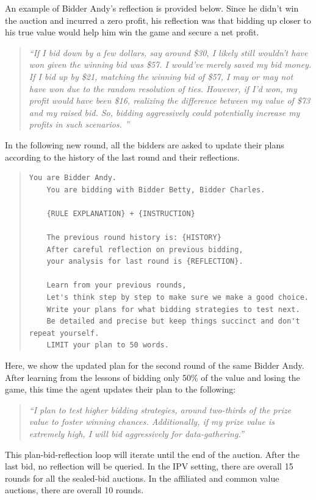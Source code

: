 \documentclass{article} %
\begin{document}
An example of Bidder Andy's reflection is provided below. Since he didn't win the auction and incurred a zero profit, his reflection was that bidding up closer to his true value would help him win the game and secure a net profit.
\begin{quote}
   \textit{ ``If I bid down by a few dollars, say around \$30, I likely still wouldn't have won given the winning bid was \$57. I would've merely saved my bid money. If I bid up by \$21, matching the winning bid of \$57, I may or may not have won due to the random resolution of ties. However, if I'd won, my profit would have been \$16, realizing the difference between my value of \$73 and my raised bid. So, bidding aggressively could potentially increase my profits in such scenarios. ''}
\end{quote}

In the following new round, all the bidders are asked to update their plans according to the history of the last round and their reflections.
\begin{quote}
\begin{lstlisting}[basicstyle=\ttfamily]
    You are Bidder Andy.            
    You are bidding with Bidder Betty, Bidder Charles.     
    
    {RULE EXPLANATION} + {INSTRUCTION}

    The previous round history is: {HISTORY}
    After careful reflection on previous bidding,
    your analysis for last round is {REFLECTION}. 
    
    Learn from your previous rounds, 
    Let's think step by step to make sure we make a good choice. 
    Write your plans for what bidding strategies to test next.
    Be detailed and precise but keep things succinct and don't repeat yourself. 
    LIMIT your plan to 50 words. 
\end{lstlisting}
\end{quote}

Here, we show the updated plan for the second round of the same Bidder Andy. After learning from the lessons of bidding only 50\% of the value and losing the game, this time the agent updates their plan to the following:
\begin{quote}
   \textit{ ``I plan to test higher bidding strategies, around two-thirds of the prize value to foster winning chances. Additionally, if my prize value is extremely high, I will bid aggressively for data-gathering.''}
\end{quote}

This plan-bid-reflection loop will iterate until the end of the auction. 
After the last bid, no reflection will be queried.
In the IPV setting, there are overall 15 rounds for all the sealed-bid auctions. In the affiliated and common value auctions, there are overall 10 rounds.
\end{document}
